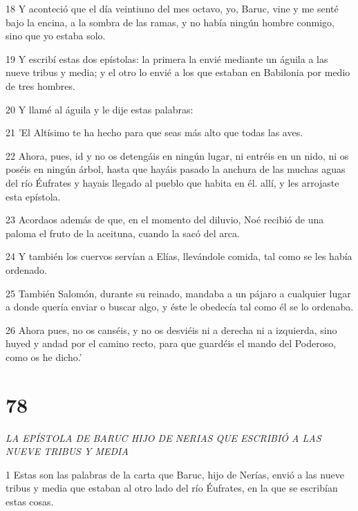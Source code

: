 \par 18 Y aconteció que el día veintiuno del mes octavo, yo, Baruc, vine y me senté bajo la encina, a la sombra de las ramas, y no había ningún hombre conmigo, sino que yo estaba solo.

\par 19 Y escribí estas dos epístolas: la primera la envié mediante un águila a las nueve tribus y media; y el otro lo envié a los que estaban en Babilonia por medio de tres hombres.

\par 20 Y llamé al águila y le dije estas palabras:

\par 21 'El Altísimo te ha hecho para que seas más alto que todas las aves.

\par 22 Ahora, pues, id y no os detengáis en ningún lugar, ni entréis en un nido, ni os poséis en ningún árbol, hasta que hayáis pasado la anchura de las muchas aguas del río Éufrates y hayais llegado al pueblo que habita en él. allí, y les arrojaste esta epístola.

\par 23 Acordaos además de que, en el momento del diluvio, Noé recibió de una paloma el fruto de la aceituna, cuando la sacó del arca.

\par 24 Y también los cuervos servían a Elías, llevándole comida, tal como se les había ordenado.

\par 25 También Salomón, durante su reinado, mandaba a un pájaro a cualquier lugar a donde quería enviar o buscar algo, y éste le obedecía tal como él se lo ordenaba.

\par 26 Ahora pues, no os canséis, y no os desviéis ni a derecha ni a izquierda, sino huyed y andad por el camino recto, para que guardéis el mando del Poderoso, como os he dicho.'

\chapter{78}

\par \textit{LA EPÍSTOLA DE BARUC HIJO DE NERIAS QUE ESCRIBIÓ A LAS NUEVE TRIBUS Y MEDIA}

\par 1 Estas son las palabras de la carta que Baruc, hijo de Nerías, envió a las nueve tribus y media que estaban al otro lado del río Éufrates, en la que se escribían estas cosas.

